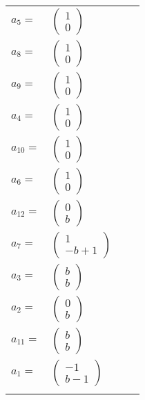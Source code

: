 \documentclass[1p]{elsarticle_modified}
\theoremstyle{definition}
\begin{document}
\begin{tabular}{m{7pt} m{180pt} m{7pt} m{180pt} }
\flushright $a_{5}=$&$\begin{pmatrix}1\\0\end{pmatrix}$ \\
\flushright $a_{8}=$&$\begin{pmatrix}1\\0\end{pmatrix}$ \\
\flushright $a_{9}=$&$\begin{pmatrix}1\\0\end{pmatrix}$ \\
\flushright $a_{4}=$&$\begin{pmatrix}1\\0\end{pmatrix}$ \\
\flushright $a_{10}=$&$\begin{pmatrix}1\\0\end{pmatrix}$ \\
\flushright $a_{6}=$&$\begin{pmatrix}1\\0\end{pmatrix}$ \\
\flushright $a_{12}=$&$\begin{pmatrix}0\\b\end{pmatrix}$ \\
\flushright $a_{7}=$&$\begin{pmatrix}1\\- b+1\end{pmatrix}$ \\
\flushright $a_{3}=$&$\begin{pmatrix}b\\b\end{pmatrix}$ \\
\flushright $a_{2}=$&$\begin{pmatrix}0\\b\end{pmatrix}$ \\
\flushright $a_{11}=$&$\begin{pmatrix}b\\b\end{pmatrix}$ \\
\flushright $a_{1}=$&$\begin{pmatrix}-1\\b-1\end{pmatrix}$\\&\end{tabular}
\end{document}
